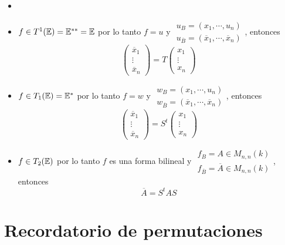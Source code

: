 \hfill
\begin{example}
	\begin{itemize}
                \item []
		\item $f \in T^1(\mathbb{E}) = \mathbb{E}^{**} = \mathbb{E}$ por lo tanto $f = u$ y $\substack{
		u_B = (x_1, \cdots, u_n) \\ u_{\overline{B}} = (\overline{x}_1, \cdots,
		\overline{x}_n)}$, entonces
		\[
			\begin{pmatrix}
				\overline{x}_1 \\
				\vdots \\
				\overline{x}_n
			\end{pmatrix}
			= T \begin{pmatrix}
				x_1 \\
				\vdots \\
				x_n
			\end{pmatrix}
		\]
		\item $f \in T_1(\mathbb{E}) = \mathbb{E}^*$ por lo tanto $f = w$ y $\substack{
		w_B = (x_1, \cdots, u_n) \\ w_{\overline{B}} = (\overline{x}_1, \cdots,
		\overline{x}_n)}$, entonces
		\[
			\begin{pmatrix}
				\overline{x}_1 \\
				\vdots \\
				\overline{x}_n
			\end{pmatrix}
				= S^t \begin{pmatrix}
				x_1 \\
				\vdots \\
				x_n
			\end{pmatrix}
		\]
		\item $f \in T_2(\mathbb{E})$ por lo tanto $f$ es una forma bilineal y $\substack{
		f_B = A \in M_{n,n}(k) \\ f_{\overline{B}} = \overline{A} \in M_{n,n}(k)}$,
		entonces
		\[
			\overline{A} = S^tAS
		\]
	\end{itemize}
\end{example}



\section{Recordatorio de permutaciones}

